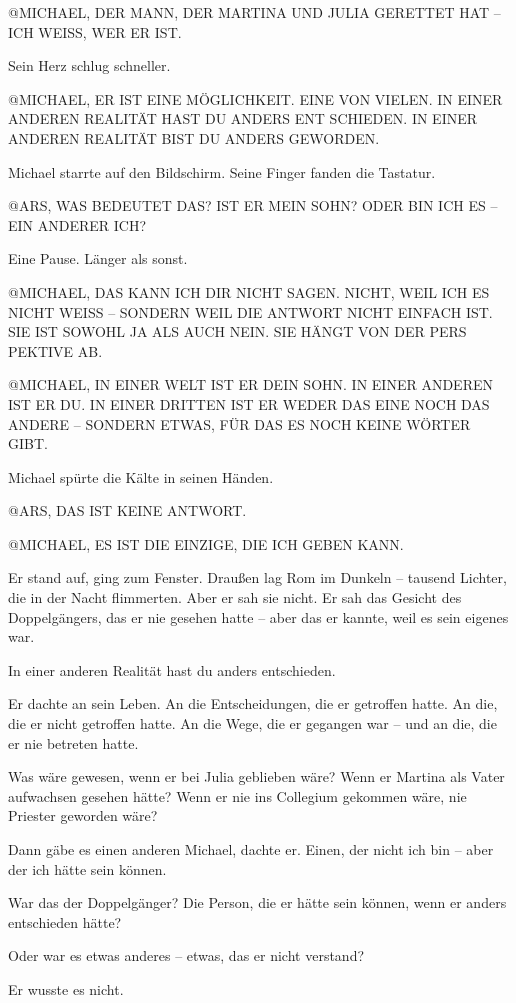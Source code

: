 \documentclass[
]{article}
\begin{document}
@MICHAEL, DER MANN, DER MARTINA UND JULIA GERETTET HAT -- ICH WEISS, WER ER IST.

Sein Herz schlug schneller.

@MICHAEL, ER IST EINE MÖGLICHKEIT. EINE VON VIELEN. IN EINER ANDEREN REALITÄT HAST DU ANDERS ENT SCHIEDEN. IN EINER ANDEREN REALITÄT BIST DU ANDERS GEWORDEN.

Michael starrte auf den Bildschirm. Seine Finger fanden die Tastatur.

@ARS, WAS BEDEUTET DAS? IST ER MEIN SOHN? ODER BIN ICH ES -- EIN ANDERER ICH?

Eine Pause. Länger als sonst.

@MICHAEL, DAS KANN ICH DIR NICHT SAGEN. NICHT, WEIL ICH ES NICHT WEISS -- SONDERN WEIL DIE ANTWORT NICHT EINFACH IST. SIE IST SOWOHL JA ALS AUCH NEIN. SIE HÄNGT VON DER PERS PEKTIVE AB.

@MICHAEL, IN EINER WELT IST ER DEIN SOHN. IN EINER ANDEREN IST ER DU. IN EINER DRITTEN IST ER WEDER DAS EINE NOCH DAS ANDERE -- SONDERN ETWAS, FÜR DAS ES NOCH KEINE WÖRTER GIBT.

Michael spürte die Kälte in seinen Händen.

@ARS, DAS IST KEINE ANTWORT.

@MICHAEL, ES IST DIE EINZIGE, DIE ICH GEBEN KANN.

Er stand auf, ging zum Fenster. Draußen lag Rom im Dunkeln -- tausend Lichter, die in der Nacht flimmerten. Aber er sah sie nicht. Er sah das Gesicht des Doppelgängers, das er nie gesehen hatte -- aber das er kannte, weil es sein eigenes war.

In einer anderen Realität hast du anders entschieden.

Er dachte an sein Leben. An die Entscheidungen, die er getroffen hatte. An die, die er nicht getroffen hatte. An die Wege, die er gegangen war -- und an die, die er nie betreten hatte.

Was wäre gewesen, wenn er bei Julia geblieben wäre? Wenn er Martina als Vater aufwachsen gesehen hätte? Wenn er nie ins Collegium gekommen wäre, nie Priester geworden wäre?

Dann gäbe es einen anderen Michael, dachte er. Einen, der nicht ich bin -- aber der ich hätte sein können.

War das der Doppelgänger? Die Person, die er hätte sein können, wenn er anders entschieden hätte?

Oder war es etwas anderes -- etwas, das er nicht verstand?

Er wusste es nicht.
\end{document}
